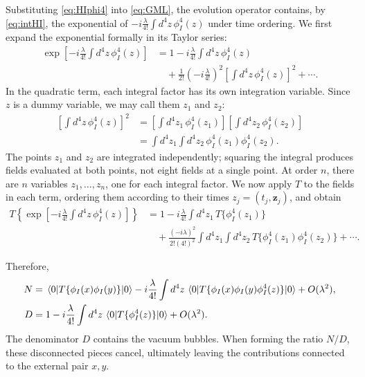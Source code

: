 \documentclass[11pt,letterpaper]{article}
\theoremstyle{definition}
\theoremstyle{definition}
\begin{document}
Substituting \eqref{eq:HIphi4} into \eqref{eq:GML}, the evolution operator
contains, by \eqref{eq:intHI}, the exponential of
$-i\frac{\lambda}{4!}\int d^4z\,\phi_I^4(z)$ under time ordering.
We first expand the exponential formally in its Taylor series:
\begin{equation}
  \begin{aligned}
  \exp\left[-i\frac{\lambda}{4!}\int d^4z\,\phi_I^4(z)\right]
  &=1-i\frac{\lambda}{4!}\int d^4z\,\phi_I^4(z)
  \\
  &\quad+\frac{1}{2!}\left(-i\frac{\lambda}{4!}\right)^2
  \left[\int d^4z\,\phi_I^4(z)\right]^2+\cdots .
  \end{aligned}
  \label{eq:DysonTaylor}
\end{equation}
In the quadratic term, each integral factor has its own integration
variable. Since $z$ is a dummy variable, we may call them $z_1$ and $z_2$:
\begin{equation}
  \begin{aligned}
  \left[\int d^4z\,\phi_I^4(z)\right]^2
  &=\left[\int d^4z_1\,\phi_I^4(z_1)\right]
    \left[\int d^4z_2\,\phi_I^4(z_2)\right]
  \\
  &=\int d^4z_1\int d^4z_2\,
    \phi_I^4(z_1)\phi_I^4(z_2).
  \end{aligned}
  \label{eq:DysonIndependentVariables}
\end{equation}
The points $z_1$ and $z_2$ are integrated independently; squaring the
integral produces fields evaluated at both points, not eight fields at
a single point. At order $n$, there are $n$ variables $z_1,\ldots,z_n$,
one for each integral factor. We now apply $T$ to the fields in each
term, ordering them according to their times $z_j=(t_j,\mathbf{z}_j)$,
and obtain
\begin{equation}
  \boxed{\begin{aligned}
  T\left\{\exp\left[-i\frac{\lambda}{4!}
  \int d^4z\,\phi_I^4(z)\right]\right\}
  &=1-i\frac{\lambda}{4!}\int d^4z_1\,
  T\{\phi_I^4(z_1)\}
  \\
  &\quad
  +\frac{(-i\lambda)^2}{2!(4!)^2}
  \int d^4z_1\int d^4z_2\,
  T\{\phi_I^4(z_1)\phi_I^4(z_2)\}+\cdots .
  \end{aligned}}
  \label{eq:Dyson}
\end{equation}

Therefore,
\begin{align}
  N
  &=\mel{0}{T\{\phi_I(x)\phi_I(y)\}}{0}
  -i\frac{\lambda}{4!}\int d^4z\,
  \mel{0}{T\{\phi_I(x)\phi_I(y)\phi_I^4(z)\}}{0}
  +O(\lambda^2),\\
  D
  &=1-i\frac{\lambda}{4!}\int d^4z\,
  \mel{0}{T\{\phi_I^4(z)\}}{0}
  +O(\lambda^2).
\end{align}
The denominator $D$ contains the vacuum bubbles. When forming the ratio
$N/D$, these disconnected pieces cancel, ultimately leaving the
contributions connected to the external pair $x,y$.
\end{document}
